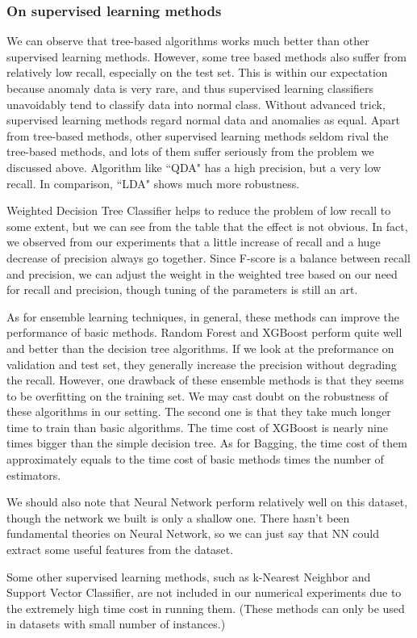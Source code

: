 \documentclass[english]{article}
\begin{document}
\subsubsection{On supervised learning methods}
\par We can observe that tree-based algorithms works much better than other supervised learning methods. However, some tree based methods also suffer from relatively low recall, especially on the test set. This is within our expectation because anomaly data is very rare, and thus supervised learning classifiers unavoidably tend to classify data into normal class. Without advanced trick, supervised learning methods regard normal data and anomalies as equal. Apart from tree-based methods, other supervised learning methods seldom rival the tree-based methods, and lots of them suffer seriously from the problem we discussed above. Algorithm like ``QDA" has a high precision, but a very low recall. In comparison, ``LDA" shows much more robustness.
\par Weighted Decision Tree Classifier helps to reduce the problem of low recall to some extent, but we can see from the table that the effect is not obvious. In fact, we observed from our experiments that a little increase of recall and a huge decrease of precision always go together. Since F-score is a balance between recall and precision, we can adjust the weight in the weighted tree based on our need for recall and precision, though tuning of the parameters is still an art.
\par As for ensemble learning techniques, in general, these methods can improve the performance of basic methods. Random Forest and XGBoost perform quite well and better than the decision tree algorithms. If we look at the preformance on validation and test set, they generally increase the precision without degrading the recall. However, one drawback of these ensemble methods is that they seems to be overfitting on the training set. We may cast doubt on the robustness of these algorithms in our setting. The second one is that they take much longer time to train than basic algorithms. The time cost of XGBoost is nearly nine times bigger than the simple decision tree. As for Bagging, the time cost of them approximately equals to the time cost of basic methods times the number of estimators.
\par We should also note that Neural Network perform relatively well on this dataset, though the network we built is only a shallow one. There hasn't been fundamental theories on Neural Network, so we can just say that NN could extract some useful features from the dataset.
\par Some other supervised learning methods, such as k-Nearest Neighbor and Support Vector Classifier, are not included in our numerical experiments due to the extremely high time cost in running them. (These methods can only be used in datasets with small number of instances.)
\end{document}
